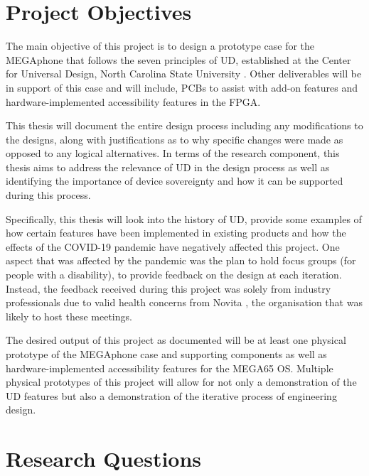 \section{Project Objectives} \label{Objectives}

The main objective of this project is to design a prototype case for the MEGAphone that follows the seven principles of UD, established at the Center for Universal Design, North Carolina State University \cite{sevenprinciples}. 
Other deliverables will be in support of this case and will include, PCBs to assist with add-on features and hardware-implemented accessibility features in the FPGA.

This thesis will document the entire design process including any modifications to the designs, along with justifications as to why specific changes were made as opposed to any logical alternatives.
In terms of the research component, this thesis aims to address the relevance of UD in the design process as well as identifying the importance of device sovereignty and how it can be supported during this process.

Specifically, this thesis will look into the history of UD, provide some examples of how certain features have been implemented in existing products and how the effects of the COVID-19 pandemic have negatively affected this project.
One aspect that was affected by the pandemic was the plan to hold focus groups (for people with a disability), to provide feedback on the design at each iteration.
Instead, the feedback received during this project was solely from industry professionals due to valid health concerns from Novita \cite{novita}, the organisation that was likely to host these meetings.

The desired output of this project as documented will be at least one physical prototype of the MEGAphone case and supporting components as well as hardware-implemented accessibility features for the MEGA65 OS.
Multiple physical prototypes of this project will allow for not only a demonstration of the UD features but also a demonstration of the iterative process of engineering design.

\section{Research Questions}


